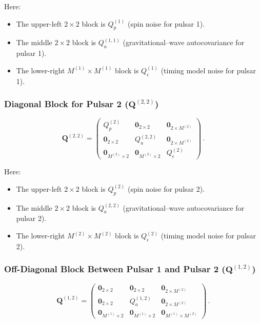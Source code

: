 \documentclass{tufte-handout} %
\begin{document}
	Here:
	\begin{itemize}
		\item The upper-left \(2\times2\) block is \(Q_p^{(1)}\) (spin noise for pulsar 1).
		\item The middle \(2\times2\) block is \(Q_a^{(1,1)}\) (gravitational–wave autocovariance for pulsar 1).
		\item The lower-right \(M^{(1)}\times M^{(1)}\) block is \(Q_\epsilon^{(1)}\) (timing model noise for pulsar 1).
	\end{itemize}
	
	\subsubsection*{Diagonal Block for Pulsar 2 (\(\boldsymbol{Q}^{(2,2)}\))}
	
	\begin{equation}
		\boldsymbol{Q}^{(2,2)} =
		\begin{pmatrix}
			Q_p^{(2)} & \boldsymbol{0}_{2\times2} & \boldsymbol{0}_{2\times M^{(2)}} \\[2mm]
			\boldsymbol{0}_{2\times2} & Q_a^{(2,2)} & \boldsymbol{0}_{2\times M^{(2)}} \\[2mm]
			\boldsymbol{0}_{M^{(2)}\times2} & \boldsymbol{0}_{M^{(2)}\times2} & Q_\epsilon^{(2)}
		\end{pmatrix}\,.
	\end{equation}
	
	Here:
	\begin{itemize}
		\item The upper-left \(2\times2\) block is \(Q_p^{(2)}\) (spin noise for pulsar 2).
		\item The middle \(2\times2\) block is \(Q_a^{(2,2)}\) (gravitational–wave autocovariance for pulsar 2).
		\item The lower-right \(M^{(2)}\times M^{(2)}\) block is \(Q_\epsilon^{(2)}\) (timing model noise for pulsar 2).
	\end{itemize}
	
	\subsubsection*{Off-Diagonal Block Between Pulsar 1 and Pulsar 2 (\(\boldsymbol{Q}^{(1,2)}\))}
	
	\begin{equation}
		\boldsymbol{Q}^{(1,2)} =
		\begin{pmatrix}
			\boldsymbol{0}_{2\times2} & \boldsymbol{0}_{2\times2} & \boldsymbol{0}_{2\times M^{(2)}} \\[2mm]
			\boldsymbol{0}_{2\times2} & Q_a^{(1,2)} & \boldsymbol{0}_{2\times M^{(2)}} \\[2mm]
			\boldsymbol{0}_{M^{(1)}\times2} & \boldsymbol{0}_{M^{(1)}\times2} & \boldsymbol{0}_{M^{(1)}\times M^{(2)}}
		\end{pmatrix}\,.
	\end{equation}
	
\end{document}
